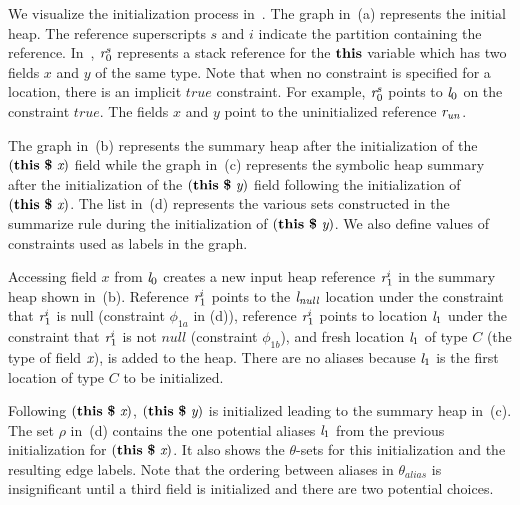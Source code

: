 We visualize the initialization process in~. The
graph in~(a) represents the initial heap. The
reference superscripts $s$ and $i$ indicate the partition containing the reference.
 In~, $\emph{r}_0^s$ represents a stack
reference for the $\textbf{this}$ variable which has two fields $x$
and $y$ of the same type. Note that when no constraint is specified for a location,
there is an implicit $\mathit{true}$ constraint. For example, $\emph{r}_0^s$
points to $\emph{l}_0$ on the constraint $\mathit{true}$. The fields $x$ and
$y$ point to the uninitialized reference $\emph{r}_\mathit{un}$.


The graph in~(b) represents the summary heap
after the initialization of the $\lp\cfgt{this}\  \cfgt{\$}\ \cfgnt{x}\rp$ field while
the graph in~(c) represents the symbolic heap
summary after the initialization of the $(\textbf{this}\  \textbf{\$}\ \emph{y})$ field
following the initialization of $\lp\cfgt{this}\  \cfgt{\$}\ \cfgnt{x}\rp$. The list
in~(d) represents the various sets constructed in
the summarize rule during the initialization of $(\textbf{this}\  \textbf{\$}\ \emph{y})$. We
also define values of constraints used as labels in the graph.

Accessing field $x$ from $\emph{l}_0$ creates a new input heap reference $\emph{r}_1^i$ in the
summary heap shown in~(b). Reference $\emph{r}_1^i$
points to the $\emph{l}_\mathit{null}$ location under the constraint that
$\emph{r}_1^i$ is null (constraint $\phi_{1a}$ in  (d)), reference
$\emph{r}_1^i$ points to location $\emph{l}_1$ under the constraint that $\emph{r}_1^i$
is not $\mathit{null}$ (constraint $\phi_{1b}$), and fresh location $\emph{l}_1$ of type $C$ 
(the type of field $\emph{x}$), is added to the heap. There are no aliases because $\emph{l}_1$ 
is the first location of type $C$ to be initialized.

Following $\lp\cfgt{this}\  \cfgt{\$}\ \cfgnt{x}\rp$, 
$(\textbf{this}\  \textbf{\$}\ \emph{y})$ is initialized leading to the summary heap
in~(c). The set $\rho$ 
in~(d) contains the one potential aliases $\emph{l}_1$ from the previous initialization for $\lp\cfgt{this}\  \cfgt{\$}\ \cfgnt{x}\rp$. It also shows the $\theta$-sets for this initialization and the resulting edge labels. Note that the ordering between aliases in $\theta_\mathit{alias}$ is insignificant until a third field is initialized and there are two potential choices.

